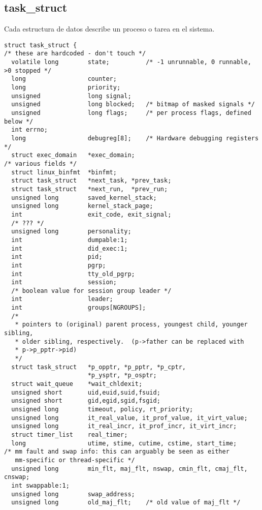 \subsection*{task\_struct}
Cada estructura de datos  describe un proceso o tarea
en el sistema.
\begin{tscreen}\begin{verbatim}
struct task_struct {
/* these are hardcoded - don't touch */
  volatile long        state;          /* -1 unrunnable, 0 runnable, >0 stopped */
  long                 counter;
  long                 priority;
  unsigned             long signal;
  unsigned             long blocked;   /* bitmap of masked signals */
  unsigned             long flags;     /* per process flags, defined below */
  int errno;
  long                 debugreg[8];    /* Hardware debugging registers */
  struct exec_domain   *exec_domain;
/* various fields */
  struct linux_binfmt  *binfmt;
  struct task_struct   *next_task, *prev_task;
  struct task_struct   *next_run,  *prev_run;
  unsigned long        saved_kernel_stack;
  unsigned long        kernel_stack_page;
  int                  exit_code, exit_signal;
  /* ??? */
  unsigned long        personality;
  int                  dumpable:1;
  int                  did_exec:1;
  int                  pid;
  int                  pgrp;
  int                  tty_old_pgrp;
  int                  session;
  /* boolean value for session group leader */
  int                  leader;
  int                  groups[NGROUPS];
  /* 
   * pointers to (original) parent process, youngest child, younger sibling,
   * older sibling, respectively.  (p->father can be replaced with 
   * p->p_pptr->pid)
   */
  struct task_struct   *p_opptr, *p_pptr, *p_cptr, 
                       *p_ysptr, *p_osptr;
  struct wait_queue    *wait_chldexit;  
  unsigned short       uid,euid,suid,fsuid;
  unsigned short       gid,egid,sgid,fsgid;
  unsigned long        timeout, policy, rt_priority;
  unsigned long        it_real_value, it_prof_value, it_virt_value;
  unsigned long        it_real_incr, it_prof_incr, it_virt_incr;
  struct timer_list    real_timer;
  long                 utime, stime, cutime, cstime, start_time;
/* mm fault and swap info: this can arguably be seen as either
   mm-specific or thread-specific */
  unsigned long        min_flt, maj_flt, nswap, cmin_flt, cmaj_flt, cnswap;
  int swappable:1;
  unsigned long        swap_address;
  unsigned long        old_maj_flt;    /* old value of maj_flt */

\end{verbatim}
\end{tscreen}
